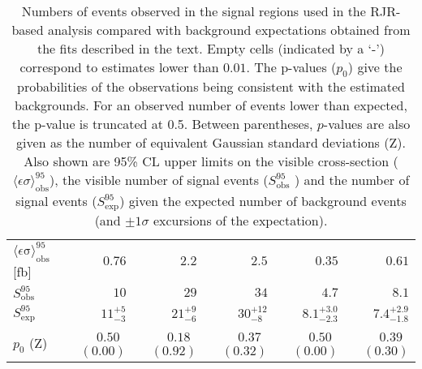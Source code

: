\begin{table}[H]
\begin{center}
\begin{tabular}{|lrrrrr|}
$\langle\epsilon\mathrm{ \sigma}\rangle_\mathrm{ obs}^{95}$ [fb]   &$0.76$   & $2.2$ & $2.5$  & $0.35$ & $0.61$  \\
$S_\mathrm{ obs}^{95}$     & $10$ & $29$ &  $34$  & $4.7$ & $8.1$ \\
$S_\mathrm{ exp}^{95}$     & $ { 11 }^{ +5 }_{ -3 }$ &  $ { 21 }^{ +9 }_{ -6 }$ & $ { 30 }^{ +12 }_{ -8 }$ & $ { 8.1 }^{ +3.0 }_{ -2.3 }$ & $ { 7.4 }^{ +2.9 }_{ -1.8 }$ \\
$p_{0}$ ($\mathrm{Z}$)        & $ 0.50$~$(0.00)$  & $ 0.18$~$(0.92)$ & $ 0.37$~$(0.32)$ & $ 0.50$~$(0.00)$  & $ 0.39$~$(0.30)$ \\
\hline
\end{tabular}


\vspace*{-0.01\textheight}\caption[p0 and UL]{Numbers of events observed in the signal regions used in the RJR-based analysis compared with background expectations obtained from the fits described in the text.
Empty cells (indicated by a `-') correspond to estimates lower than $0.01$.
The p-values ($p_{0}$) give the probabilities of the observations being consistent with the estimated backgrounds.
For an observed number of events lower than expected, the p-value is truncated at 0.5. Between parentheses, $p$-values are also given as the number of equivalent Gaussian standard deviations (Z).
Also shown are 95\% CL upper limits on the visible cross-section ($\langle\epsilon\sigma\rangle_\mathrm{ obs}^{95}$),
the visible number of signal events ($S_\mathrm{ obs}^{95}$ ) and the number of signal events ($S_\mathrm{ exp}^{95}$)
given the expected number of background events (and $\pm 1\sigma$ excursions of the expectation).
\label{tab:p0_UL_RJR}}
\end{center}
\end{table}
